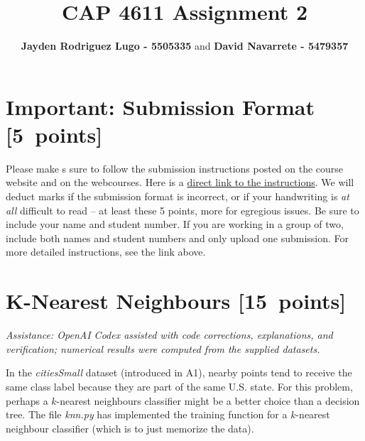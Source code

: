 \documentclass{article}
\newcommand{\blu}[1]{{\textcolor{blu}{#1}}}
\let\ask\blu
\newcommand\pts[1]{\textcolor{pointscolour}{[#1~points]}}
\begin{document}
    \title{CAP 4611 Assignment 2}
    \author{\textbf{Jayden Rodriguez Lugo - 5505335} and 
    \textbf{David Navarrete - 5479357}}
    \date{}
    \maketitle


    \section*{Important: Submission Format \pts{5}}

    Please make s sure to follow the submission instructions posted on the
    course website and on the webcourses. Here is a \href{https://www.dropbox.com/scl/fi/gpwv8s5b6xx16cepm1bn9/submission_instructions.pdf?rlkey=m3l066bopj9bu1l9m53rbcucs&raw=1}{direct link to the instructions}.
    \ask{We will deduct marks if the submission format is incorrect, or
    if your handwriting is \emph{at all} difficult to read} -- at least
    these 5 points, more for egregious issues. Be sure to include your
    name and student number. If you are working in a group of two,
    include both names and student numbers and only upload one
    submission. For more detailed instructions, see the link above.

    \section{K-Nearest Neighbours \pts{15}}
    {\small\textit{Assistance: OpenAI Codex assisted with code corrections, explanations, and verification; numerical results were computed from the supplied datasets.}}

    In the \emph{citiesSmall} dataset (introduced in A1), nearby points tend to receive the same class label because they are part of the same U.S. state. For this problem, perhaps a $k$-nearest neighbours classifier might be a better choice than a decision tree. The file \emph{knn.py} has implemented the training function for a $k$-nearest neighbour classifier (which is to just memorize the data).
\end{document}

